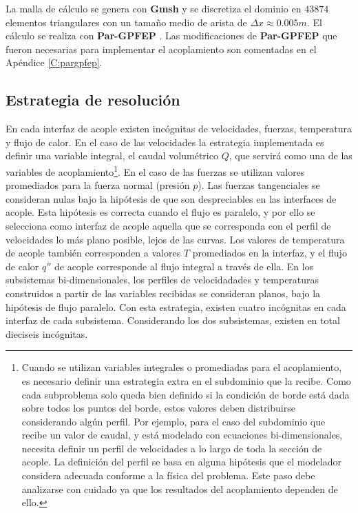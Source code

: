 La malla de cálculo se genera con \textbf{Gmsh} \cite{gmsh} y se discretiza el dominio en $43874$ elementos triangulares
con un tamaño medio de arista de $\Delta x \approx 0.005m$.
El cálculo se realiza con \textbf{Par-GPFEP} \cite{gpfep} \cite{pargpfep}.
Las modificaciones de \textbf{Par-GPFEP} que fueron necesarias para implementar el acoplamiento son comentadas en el Apéndice \ref{C:pargpfep}.


\subsection*{Estrategia de resolución}

En cada interfaz de acople existen incógnitas de velocidades, fuerzas, temperatura y flujo de calor.
En el caso de las velocidades la estrategia implementada es definir una variable integral, 
el caudal volumétrico $Q$, que servirá como una de las variables de acoplamiento\footnote{
Cuando se utilizan variables integrales o promediadas para el acoplamiento, es necesario definir una estrategia extra en el subdominio que la recibe.
Como cada subproblema solo queda bien definido si la condición de borde está dada sobre todos los puntos del borde, estos valores deben distribuirse considerando algún perfil.
Por ejemplo, para el caso del subdominio que recibe un valor de caudal, y está modelado con ecuaciones bi-dimensionales, necesita definir un perfil de velocidades a lo largo de toda la sección de acople.
La definición del perfil se basa en alguna hipótesis que el modelador considera adecuada conforme a la física del problema.
Este paso debe analizarse con cuidado ya que los resultados del acoplamiento dependen de ello.
}.
En el caso de las fuerzas se utilizan valores promediados para la fuerza normal (presión $p$).
Las fuerzas tangenciales se consideran nulas bajo la hipótesis de que son despreciables en las interfaces de acople.
Esta hipótesis es correcta cuando el flujo es paralelo, 
y por ello se selecciona como interfaz de acople aquella que se corresponda con el perfil de velocidades lo más plano posible, lejos de las curvas.
Los valores de temperatura de acople también corresponden a valores $T$ promediados en la interfaz,
y el flujo de calor $q''$ de acople corresponde al flujo integral a través de ella.
En los subsistemas bi-dimensionales, los perfiles de velocidadades y temperaturas construidos a partir de las variables recibidas se consideran planos,
bajo la hipótesis de flujo paralelo.
Con esta estrategia, existen cuatro incógnitas en cada interfaz de cada subsistema. 
Considerando los dos subsistemas, existen en total dieciseis incógnitas.

